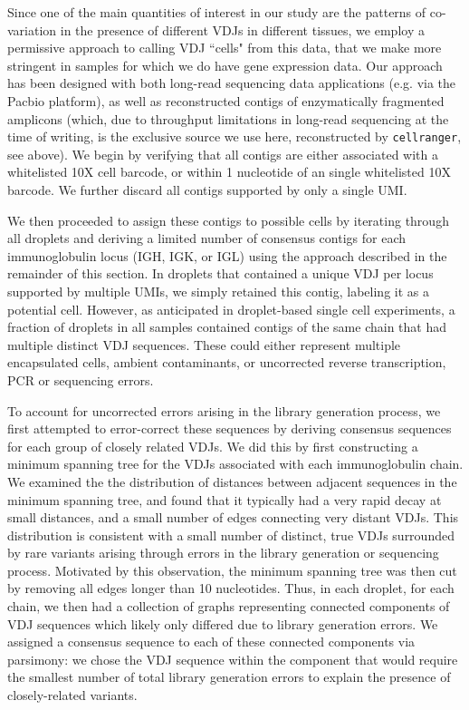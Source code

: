 Since one of the main quantities of interest in our study are the patterns of co-variation in the presence of different VDJs in different tissues, we employ a permissive approach to calling VDJ ``cells" from this data, that we make more stringent in samples for which we do have gene expression data. Our approach has been designed with both long-read sequencing data applications (e.g. via the Pacbio platform), as well as reconstructed contigs of enzymatically fragmented amplicons (which, due to throughput limitations in long-read sequencing at the time of writing, is the exclusive source we use here, reconstructed by \verb|cellranger|, see  above). We begin by verifying that all contigs are either associated with a whitelisted 10X cell barcode, or within 1 nucleotide of an single whitelisted 10X barcode. We further discard all contigs supported by only a single UMI.

We then proceeded to assign these contigs to possible cells by iterating through all droplets and deriving a limited number of consensus contigs for each immunoglobulin locus (IGH, IGK, or IGL) using the approach described in the remainder of this section. In droplets that contained a unique VDJ per locus supported by multiple UMIs, we simply retained this contig, labeling it as a potential cell. However, as anticipated in droplet-based single cell experiments, a fraction of droplets in all samples contained contigs of the same chain that had multiple distinct VDJ sequences. These could either represent multiple encapsulated cells, ambient contaminants, or uncorrected reverse transcription, PCR or sequencing errors. 

To account for uncorrected errors arising in the library generation process, we first attempted to error-correct these sequences by deriving consensus sequences for each group of closely related VDJs. We did this by first constructing a minimum spanning tree for the VDJs associated with each immunoglobulin chain. We examined the the distribution of distances between adjacent sequences in the minimum spanning tree, and found that it typically had a very rapid decay at small distances, and a small number of edges connecting very distant VDJs. This distribution is consistent with a small number of distinct, true VDJs surrounded by rare variants arising through errors in the library generation or sequencing process. Motivated by this observation, the minimum spanning tree was then cut by removing all edges longer than 10 nucleotides. Thus, in each droplet, for each chain, we then had a collection of graphs representing connected components of VDJ sequences which likely only differed  due to library generation errors. We assigned a consensus sequence to each of these connected components via parsimony: we chose the VDJ sequence within the component that would require the smallest number of total library generation errors to explain the presence of closely-related variants.

